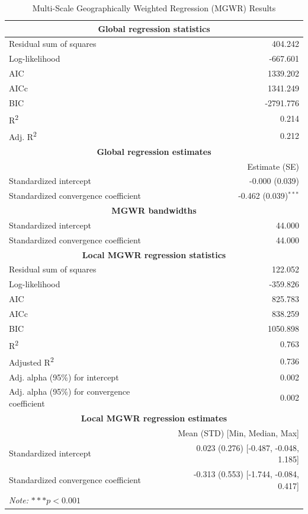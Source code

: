 \documentclass[smallextended, natbib]{svjour3}       %
\begin{document}
\begin{table}[h]
\centering
\caption{Multi-Scale Geographically Weighted Regression (MGWR) Results}
\label{tab:mgwr}
\small
\begin{tabular}{lr}
\hline

\multicolumn{2}{c}{\textbf{Global regression statistics}} \\
\hline
Residual sum of squares & 404.242 \\
Log-likelihood & -667.601 \\
AIC & 1339.202 \\
AICc & 1341.249 \\
BIC & -2791.776 \\
R\textsuperscript{2} & 0.214 \\
Adj. R\textsuperscript{2} & 0.212 \\
\hline

\multicolumn{2}{c}{\textbf{Global regression estimates}} \\
\hline
 & Estimate (SE)  \\
Standardized intercept & -0.000 (0.039)  \\
Standardized convergence coefficient & -0.462 (0.039)$^{***}$  \\
\hline

\multicolumn{2}{c}{\textbf{MGWR bandwidths}} \\
\hline

Standardized intercept & 44.000  \\
Standardized convergence coefficient & 44.000  \\
\hline

\multicolumn{2}{c}{\textbf{Local MGWR regression statistics}} \\
\hline
Residual sum of squares & 122.052 \\
Log-likelihood & -359.826 \\
AIC & 825.783 \\
AICc & 838.259 \\
BIC & 1050.898 \\
R\textsuperscript{2} & 0.763 \\
Adjusted R\textsuperscript{2} & 0.736 \\
Adj. alpha (95\%) for intercept & 0.002 \\
Adj. alpha (95\%) for convergence coefficient & 0.002 \\
\hline

\multicolumn{2}{c}{\textbf{Local MGWR regression estimates}} \\
\hline
 & Mean (STD) [Min, Median, Max] \\
Standardized intercept & 0.023 (0.276) [-0.487, -0.048, 1.185] \\
Standardized convergence coefficient & -0.313 (0.553) [-1.744, -0.084, 0.417] \\
\hline
\multicolumn{2}{l}{\textit{Note:} $***p<0.001$} \\
\end{tabular}
\end{table}
\end{document}
